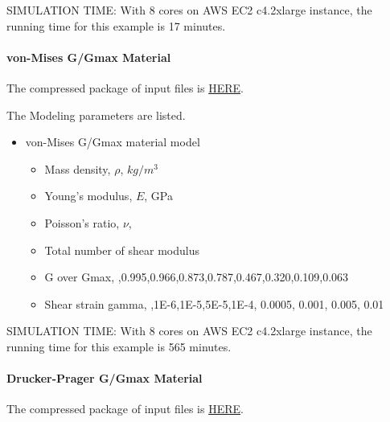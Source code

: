 SIMULATION TIME: With 8 cores on AWS EC2 c4.2xlarge instance, the running time for this example is 17 minutes.

\paragraph{von-Mises G/Gmax Material}
The compressed package of input files is  
\href{https://github.com/yuan-energy/Real-ESSI-Short-Course-Examples/tree/master/short-course-examples/nonlinear_analysis_steps/free_field_3D/vonMisesGoverGmax/vonMisesGoverGmax.tgz?raw=true}{HERE}. 

The Modeling parameters are listed.
\begin{itemize}
  \item von-Mises G/Gmax material model 
  \begin{itemize}
    \item Mass density, $\rho$, \enspace {} $kg/m^3$
    \item Young's modulus, $E$, \enspace {} GPa
    \item Poisson's ratio, $\nu$, \enspace {}
    \item Total number of shear modulus \enspace {}
    \item G over Gmax, \enspace {},0.995,0.966,0.873,0.787,0.467,0.320,0.109,0.063
    \item Shear strain gamma, \enspace {},1E-6,1E-5,5E-5,1E-4, 0.0005, 0.001, 0.005, 0.01
  \end{itemize}
\end{itemize}


SIMULATION TIME: With 8 cores on AWS EC2 c4.2xlarge instance, the running time for this example is 565 minutes.

\paragraph{Drucker-Prager G/Gmax Material}
The compressed package of input files is  
\href{https://github.com/yuan-energy/Real-ESSI-Short-Course-Examples/tree/master/short-course-examples/nonlinear_analysis_steps/free_field_3D/DruckerPragerGoverGmax/DruckerPragerGoverGmax.tgz?raw=true}{HERE}. 


